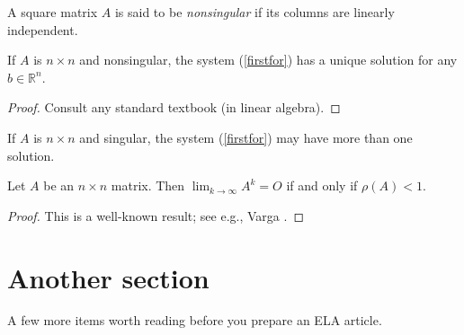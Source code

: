 \documentclass[10pt,twoside]{siamart1116}
\newcommand{\reals}{\mathbb{R}}
\begin{document}
\begin{definition}
{\rm A square matrix $A$ is said to be {\em nonsingular} if its columns are 
linearly independent. }
\end{definition}

\begin{lemma} \label{main-lem}
If $A$ is $n \times n$ and nonsingular, the system {\rm (\ref{firstfor})} 
has a unique solution for any $b \in \reals^n$.
\end{lemma}

\begin{proof}
Consult any standard textbook (in linear algebra).
\end{proof}

\begin{corollary}
If $A$ is $n \times n$ and singular, the system {\rm (\ref{firstfor})} 
may have more than one solution.
\end{corollary}

\begin{theorem} \label{main-th}
Let $A$ be an $n \times n$ matrix. Then 
$\displaystyle{\lim_{k \rightarrow \infty}} A^k =O$ 
if and only if $\rho(A) <1$.
\end{theorem}

\begin{proof}
This is a well-known result; see e.g., Varga \cite[Some result]{varga-62}.
\end{proof}

\section{Another section}
A few more items worth reading before you prepare an ELA article.
\end{document}
